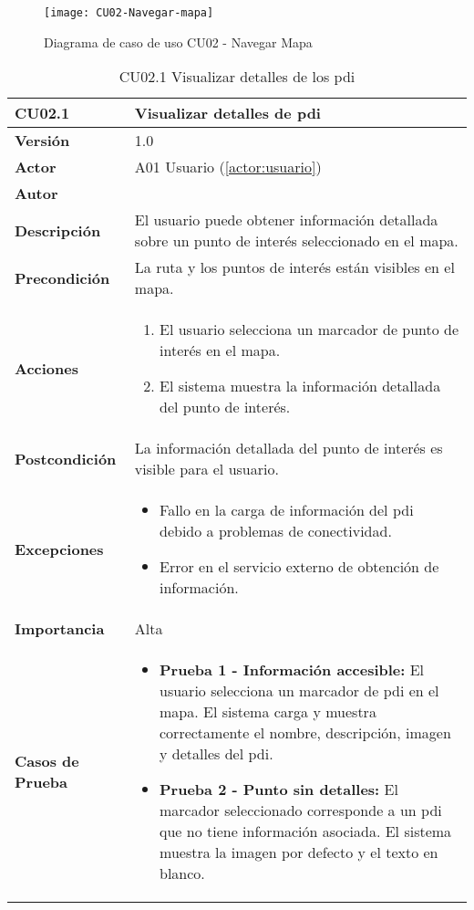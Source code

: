 \begin{figure}[H]
	\centering
	\texttt{[image: CU02-Navegar-mapa]}
	\caption{Diagrama de caso de uso CU02 - Navegar Mapa}
	\label{CU02-Navegar-mapa}
\end{figure}



\begin{table}[H]
	\centering
	\begin{tabularx}{\linewidth}{ p{} p{} }
		\toprule
		\textbf{CU02.1}    & \textbf{Visualizar detalles de \acrfull{pdi}} \\
		\toprule
		\textbf{Versión}              & 1.0    \\
		\textbf{Actor}                & A01 Usuario (\ref{actor:usuario}) \\
		\textbf{Autor}                & \autor \\
		\textbf{Descripción}          & El usuario puede obtener información detallada sobre un punto de interés seleccionado en el mapa. \\
		\textbf{Precondición}         & La ruta y los puntos de interés están visibles en el mapa. \\
		\textbf{Acciones}             &
		\begin{enumerate}
			\def\labelenumi{\arabic{enumi}.}
			\tightlist
			\item El usuario selecciona un marcador de punto de interés en el mapa.
			\item El sistema muestra la información detallada del punto de interés.
		\end{enumerate}\\
		\textbf{Postcondición}        & La información detallada del punto de interés es visible para el usuario. \\
		\textbf{Excepciones}          & 
		\begin{itemize}
			\tightlist
			\item Fallo en la carga de información del \acrlong{pdi} debido a problemas de conectividad.
			\item Error en el servicio externo de obtención de información.
		\end{itemize}\\
		\textbf{Importancia}          & Alta \\
		\textbf{Casos de Prueba}      &
		\begin{itemize}
			\item \textbf{Prueba 1 - Información accesible:} El usuario selecciona un marcador de \acrshort{pdi} en el mapa. El sistema carga y muestra correctamente el nombre, descripción, imagen y detalles del \acrlong{pdi}.
			\vspace{2pt}
			\item \textbf{Prueba 2 - Punto sin detalles:} El marcador seleccionado corresponde a un \acrshort{pdi} que no tiene información asociada. El sistema muestra la imagen por defecto y el texto en blanco.
		\end{itemize} \\
		\bottomrule
	\end{tabularx}
	\caption{CU02.1 Visualizar detalles de los \acrfull{pdi}}
	\label{cu:visualizar-detalles}
\end{table}
